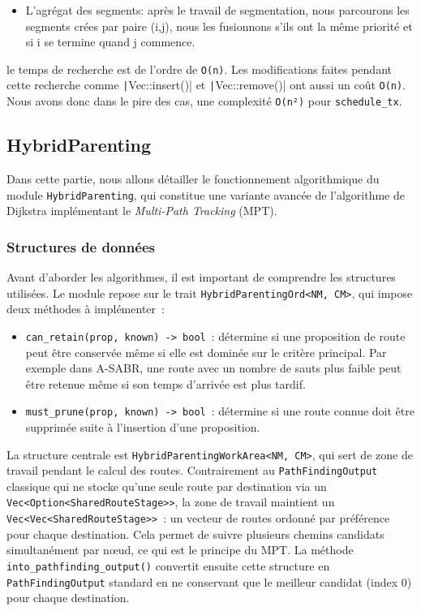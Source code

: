 \documentclass{article}
\begin{document}
\begin{description}
\begin{itemize}
\begin{itemize}
        \end{itemize}
        \item L'agrégat des segments: après le travail de segmentation, nous parcourons les segments crées par paire (i,j), nous les fusionnons s'ils ont la même priorité et si i se termine quand j commence.
    \end{itemize}
    \item[La complexité en temps: ] le temps de recherche est de l'ordre de \texttt{O(n)}. Les modifications faites pendant cette recherche comme \texttt|Vec::insert()| et \texttt|Vec::remove()| ont aussi un coût \texttt{O(n)}.
Nous avons donc dans le pire des cas, une complexité \texttt{O(n²)} pour \texttt{schedule\_tx}.
\end{description}

\subsection{HybridParenting}

Dans cette partie, nous allons détailler le fonctionnement algorithmique du module \texttt{HybridParenting},
qui constitue une variante avancée de l'algorithme de Dijkstra implémentant le \textit{Multi-Path Tracking} (MPT).

\subsubsection*{Structures de données}

Avant d'aborder les algorithmes, il est important de comprendre les structures utilisées.
Le module repose sur le trait \texttt{HybridParentingOrd<NM, CM>}, qui impose deux méthodes à implémenter~:
\begin{itemize}
    \item \texttt{can\_retain(prop, known) -> bool}~: détermine si une proposition de route peut être conservée
    même si elle est dominée sur le critère principal. Par exemple dans A-SABR, une route avec
    un nombre de sauts plus faible peut être retenue même si son temps d'arrivée est plus tardif.
    \item \texttt{must\_prune(prop, known) -> bool}~: détermine si une route connue doit être supprimée
    suite à l'insertion d'une proposition.
\end{itemize}


La structure centrale est \texttt{HybridParentingWorkArea<NM, CM>}, qui sert de zone de travail pendant
le calcul des routes. Contrairement au \texttt{PathFindingOutput} classique qui ne stocke qu'une seule
route par destination via un \\ \texttt{Vec<Option<SharedRouteStage>>},
la zone de travail maintient un \texttt{Vec<Vec<SharedRouteStage>>}~: un vecteur de routes
ordonné par préférence pour chaque destination. Cela permet de suivre plusieurs chemins candidats
simultanément par nœud, ce qui est le principe du MPT. La méthode
\texttt{into\_pathfinding\_output()} convertit ensuite cette structure en \texttt{PathFindingOutput}
standard en ne conservant que le meilleur candidat (index 0) pour chaque destination.
\end{document}
